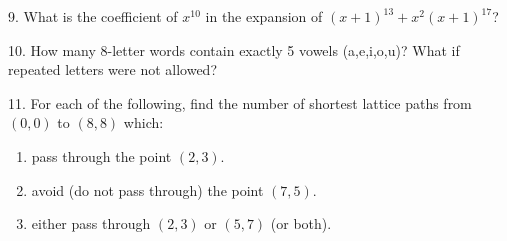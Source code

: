 \documentclass[10pt,]{book}
\theoremstyle{plain}
\theoremstyle{definition}
\theoremstyle{definition}
\theoremstyle{definition}
\numberwithin{equation}{section}
\begin{document}
\begin{exerciselist}
\par\smallskip
\item[9.]\hypertarget{exercise-110}{}
            What is the coefficient of \(x^{10}\) in the expansion of \((x+1)^{13} + x^2(x+1)^{17}\)?
\par\smallskip
\item[10.]\hypertarget{exercise-111}{}
            How many 8-letter words contain exactly 5 vowels (a,e,i,o,u)? What if repeated letters were not allowed?
\par\smallskip
\item[11.]\hypertarget{exercise-112}{}
            For each of the following, find the number of shortest lattice paths from \((0,0)\) to \((8,8)\) which:
          \leavevmode%
\begin{enumerate}[label=(\alph*)]
\item\hypertarget{li-741}{}
                pass through the point \((2,3)\).
\item\hypertarget{li-742}{}
                avoid (do not pass through) the point \((7,5)\).
\item\hypertarget{li-743}{}
                either pass through \((2,3)\) or \((5,7)\) (or both).
\end{enumerate}


\end{exerciselist}
\end{document}
